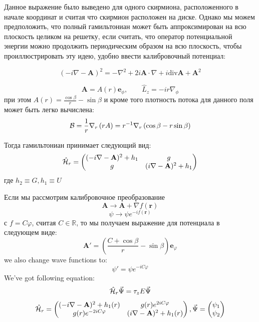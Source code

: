 \documentclass[a4paper,article,14pt]{extarticle}
\begin{document}
Данное выражение было выведено для одного скирмиона, расположенного в начале координат и считая что скирмион расположен на диске. Однако мы можем предположить, что полный гамильтониан может быть аппроксимирован на всю плоскость целиком на решетку, если считать, что оператор потенциальной энергии можно продолжить периодическим образом на всю плоскость, чтобы проиллюстрировать эту идею, удобно ввести калибровочный потенциал:


\begin{equation}
(- i \nabla - \mathbf{A} ) ^ 2 = - \nabla ^ 2 + 2 i \mathbf{A} \cdot \nabla + i \text{div} \mathbf{A}  + \mathbf{A}^2
\end{equation}

$$
\mathbf{A} = A(r) \mathbf{e}_\phi ,  \qquad  \hat{L}_{z} = - i r \nabla_\phi
$$
при этом $A(r) = \frac{ \cos\beta } { r } - \sin \beta$ и кроме того плотность потока для данного поля может быть легко вычислена:
$$
{\cal B}  = \frac 1 r \nabla_r \left(r A \right) = 
r^{-1}  \nabla_r \left(\cos\beta   -  r  \sin \beta \right)  
$$

Тогда гамильтониан принимает следующий вид:
\begin{equation}
\hat {\cal H}_{r} =\begin{pmatrix} (- i \nabla - \mathbf{A} ) ^ 2 + h_1 & g \\ g & ( i \nabla - \mathbf{A} ) ^ 2 + h_1 \end{pmatrix}
\end{equation}
где $ h_2 \equiv G , h_1 \equiv U$

Если мы рассмотрим калибровочное преобразование 
$$
\mathbf{A} \rightarrow \mathbf{A} + \nabla f(\mathbf{r})
$$
$$
\psi \rightarrow \psi e ^ {- i f(\mathbf{r})}
$$
с  $f = C \varphi$, считая $C \in \mathbb{R}$, то мы получаем выражение для потенциала в следующем виде:
$$
\mathbf{A'}= \left(\frac {C + \cos{\beta}} {r} - \sin{\beta} \right) \mathbf{e}_\varphi
$$
we also change wave functions to:
$$
\psi' = \psi e^{-i C \varphi} 
$$
We've got following equation:
$$
\hat {\cal H}_{r} \vec{\Psi} = \tau_z E \vec{\Psi}
$$
$$
\hat {\cal H}_{r} =\begin{pmatrix} (- i \nabla - \mathbf{A} ) ^ 2 + h_1 (r) &  g (r) e^{2 i C \varphi} \\  g (r) e^{-2 i C \varphi}   & ( i \nabla - \mathbf{A} ) ^ 2 + h_1 (r) \end{pmatrix}, \vec{\Psi} = \begin{pmatrix}  \psi_1 \\ \psi_2 \end{pmatrix}
$$
\end{document}
